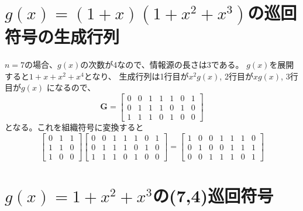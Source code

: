 \documentclass[a4paper,11pt]{jsarticle}
\begin{document}
\section{$g(x)=(1+x)(1+x^2+x^3)$の巡回符号の生成行列}
$n=7$の場合、$g(x)$の次数が4なので、情報源の長さは3である。
$g(x)$を展開すると$1+x+x^2+x^4$となり、
生成行列は1行目が$x^2g(x)$, 2行目が$xg(x)$, 3行目が$g(x)$
になるので、
\[
  {\bm G}=
  \begin{bmatrix}
    0 & 0 & 1 & 1 & 1 & 0 & 1 \\
    0 & 1 & 1 & 1 & 0 & 1 & 0 \\
    1 & 1 & 1 & 0 & 1 & 0 & 0
  \end{bmatrix}
\]
となる。これを組織符号に変換すると
\[
  \begin{bmatrix}
    0 & 1 & 1 \\
    1 & 1 & 0 \\
    1 & 0 & 0
  \end{bmatrix}
  \begin{bmatrix}
    0 & 0 & 1 & 1 & 1 & 0 & 1 \\
    0 & 1 & 1 & 1 & 0 & 1 & 0 \\
    1 & 1 & 1 & 0 & 1 & 0 & 0
  \end{bmatrix}=
  \begin{bmatrix}
    1 & 0 & 0 & 1 & 1 & 1 & 0 \\
    0 & 1 & 0 & 0 & 1 & 1 & 1 \\
    0 & 0 & 1 & 1 & 1 & 0 & 1
  \end{bmatrix}
\]

\section{$g(x)=1+x^2+x^3$の(7,4)巡回符号}
\end{document}
